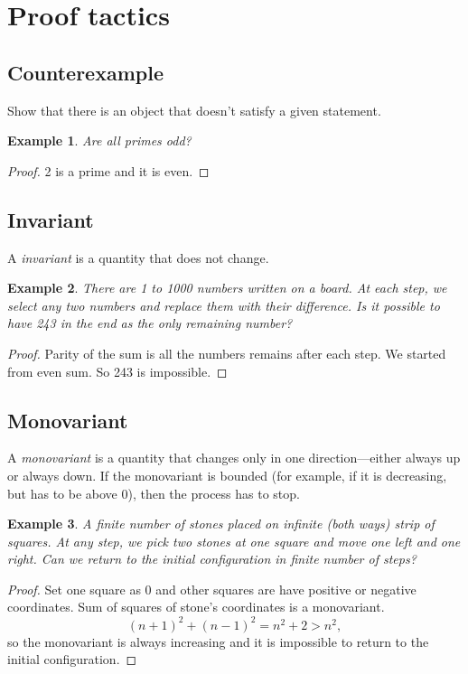 \documentclass[11pt]{article}
\newtheorem{theorem}{Example}
\begin{document}
\section{Proof tactics}

\subsection{Counterexample}

Show that there is an object that doesn't satisfy a given statement.

\begin{theorem}
  Are all primes odd?
\end{theorem}
\begin{proof}
  2 is a prime and it is even.
\end{proof}

\subsection{Invariant}

A \emph{invariant} is a quantity that does not change.

\begin{theorem}
  There are 1 to 1000 numbers written on a board. At each step, we select any two numbers and replace them with their difference. Is it possible to have 243 in the end as the only remaining number?
\end{theorem}
\begin{proof}
  Parity of the sum is all the numbers remains after each step. We started from even sum. So 243 is impossible.
\end{proof}

\subsection{Monovariant}

A \emph{monovariant} is a quantity that changes only in one direction---either always up or always down.
If the monovariant is bounded (for example, if it is decreasing, but has to be above 0), then the process has to stop.

\begin{theorem}
  A finite number of stones placed on infinite (both ways) strip of squares. At any step, we pick two stones at one square and move one left and one right. Can we return to the initial configuration in finite number of steps?
\end{theorem}
\begin{proof}
  Set one square as 0 and other squares are have positive or negative coordinates.
  Sum of squares of stone's coordinates is a monovariant.
  \[ (n + 1)^2 + (n - 1)^2 = n^2 + 2 > n^2,\]
  so the monovariant is always increasing and it is impossible to return to the initial configuration.
\end{proof}
\end{document}
